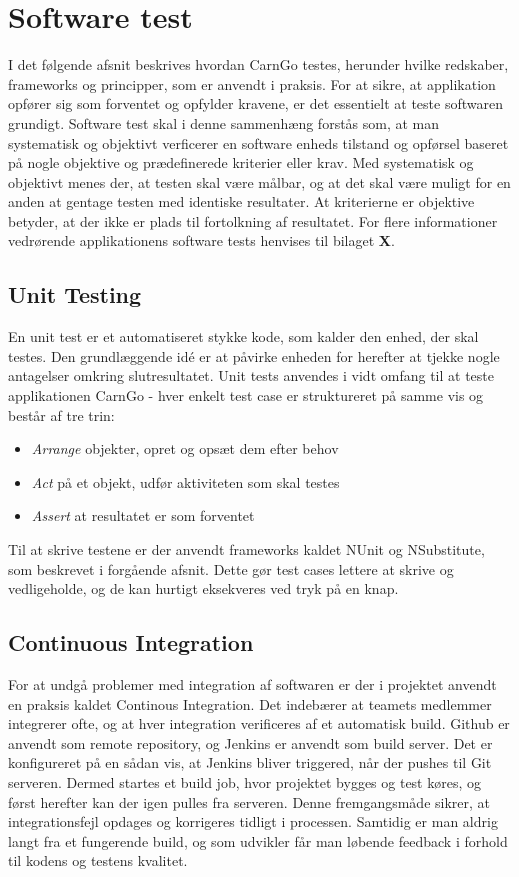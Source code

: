 \documentclass[Rapport/Rapport_main.tex]{subfiles}
\begin{document}
\section{Software test}
I det følgende afsnit beskrives hvordan CarnGo testes, herunder hvilke redskaber, frameworks og principper, som er anvendt i praksis. For at sikre, at applikation opfører sig som forventet og opfylder kravene, er det essentielt at teste softwaren grundigt. Software test skal i denne sammenhæng forstås som, at man systematisk og objektivt verficerer en software enheds tilstand og opførsel baseret på nogle objektive og prædefinerede kriterier eller krav. Med systematisk og objektivt menes der, at testen skal være målbar, og at det skal være muligt for en anden at gentage testen med identiske resultater. At kriterierne er objektive betyder, at der ikke er plads til fortolkning af resultatet. For flere informationer vedrørende applikationens software tests henvises til bilaget \textbf{X}.

\subsection{Unit Testing}
En unit test er et automatiseret stykke kode, som kalder den enhed, der skal testes. Den grundlæggende idé er at påvirke enheden for herefter at tjekke nogle antagelser omkring slutresultatet. Unit tests anvendes i vidt omfang til at teste applikationen CarnGo - hver enkelt test case er struktureret på samme vis og består af tre trin:
\begin{itemize}
    \item \textit{Arrange} objekter, opret og opsæt dem efter behov
    \item \textit{Act} på et objekt, udfør aktiviteten som skal testes
    \item \textit{Assert} at resultatet er som forventet
\end{itemize}
Til at skrive testene er der anvendt frameworks kaldet NUnit og NSubstitute, som beskrevet i forgående afsnit. Dette gør test cases lettere at skrive og vedligeholde, og de kan hurtigt eksekveres ved tryk på en knap.

\subsection{Continuous Integration}
For at undgå problemer med integration af softwaren er der i projektet anvendt en praksis kaldet Continous Integration. Det indebærer at teamets medlemmer integrerer ofte, og at hver integration verificeres af et automatisk build. Github er anvendt som remote repository, og Jenkins er anvendt som build server. Det er konfigureret på en sådan vis, at Jenkins bliver triggered, når der pushes til Git serveren. Dermed startes et build job, hvor projektet bygges og test køres, og først herefter kan der igen pulles fra serveren. Denne fremgangsmåde sikrer, at integrationsfejl opdages og korrigeres tidligt i processen. Samtidig er man aldrig langt fra et fungerende build, og som udvikler får man løbende feedback i forhold til kodens og testens kvalitet.
\end{document}
